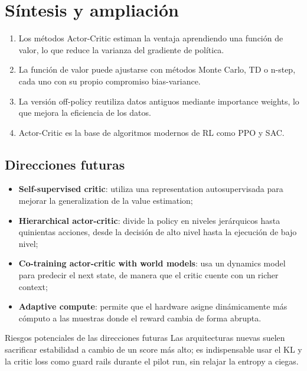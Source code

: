 \section{Síntesis y ampliación}

\begin{enumerate}
    \item Los métodos Actor-Critic estiman la ventaja aprendiendo una función de valor, lo que reduce la varianza del gradiente de política.
    \item La función de valor puede ajustarse con métodos Monte Carlo, TD o n-step, cada uno con su propio compromiso bias-variance.
    \item La versión off-policy reutiliza datos antiguos mediante importance weights, lo que mejora la eficiencia de los datos.
    \item Actor-Critic es la base de algoritmos modernos de RL como PPO y SAC.
\end{enumerate}

\subsection{Direcciones futuras}

\begin{itemize}
    \item \textbf{Self-supervised critic}: utiliza una representation autosupervisada para mejorar la generalization de la value estimation;
    \item \textbf{Hierarchical actor-critic}: divide la policy en niveles jerárquicos hasta quinientas acciones, desde la decisión de alto nivel hasta la ejecución de bajo nivel;
    \item \textbf{Co-training actor-critic with world models}: usa un dynamics model para predecir el next state, de manera que el critic cuente con un richer context;
    \item \textbf{Adaptive compute}: permite que el hardware asigne dinámicamente más cómputo a las muestras donde el reward cambia de forma abrupta.
\end{itemize}

\begin{warningbox}{Riesgos potenciales de las direcciones futuras}
Las arquitecturas nuevas suelen sacrificar estabilidad a cambio de un score más alto; es indispensable usar el KL y la critic loss como guard rails durante el pilot run, sin relajar la entropy a ciegas.
\end{warningbox}

